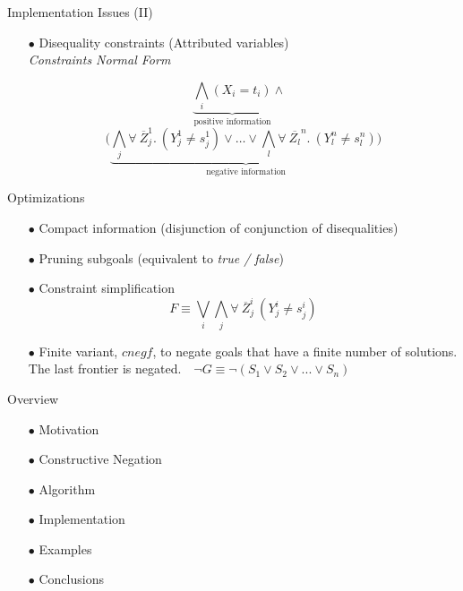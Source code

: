 \documentclass[pdf,slideColor,contemporain]{prosper}
\begin{document}
\begin{slide}{Implementation Issues (II)}
     \begin{itemize}

        \item[$\bullet$] {\blue Disequality constraints} (Attributed
        variables) \\
        \emph{Constraints Normal Form}\\
\begin{small}

\[ \underbrace{\bigwedge_i (X_i = t_i)}_{\mbox{positive information}} \wedge~~~\] 
\[(
\underbrace{\bigwedge_j \forall~ \overline{Z}_j^1.~(Y_j^1 \neq s_j^1)
\vee \ldots \vee \bigwedge_l \forall~ \overline{Z_l}^n.~(Y_l^n
\neq s_l^n) )}_{\mbox{negative information}} \]


\end{small}

     \end{itemize}
\end{slide}
\begin{slide}{Optimizations}
     \begin{itemize}

        \item[$\bullet$] {\blue Compact information} (disjunction of conjunction of disequalities) 

        \item[$\bullet$] {\blue Pruning subgoals} (equivalent to \emph{true / false}) 
        \item[$\bullet$] {\blue Constraint simplification}
\[ F \equiv  \bigvee_i\bigwedge_j \forall~ \overline{Z}_j^i~(Y_j^i \neq s_j^i) \]
\item[$\bullet$] {\blue Finite variant}, $cnegf$, to negate goals that have a
  finite number of solutions. The last frontier is negated. $~~~\neg G \equiv
  \neg(S_1 \vee S_2 \vee ... \vee S_n) $
     \end{itemize}
\end{slide}

\begin{slide}{Overview}
\vspace{0.8cm}
        \begin{itemize}
                \item[{\blue $\bullet$}] Motivation
                \item[{\blue $\bullet$}] Constructive Negation
                \item[{\blue $\bullet$}] Algorithm
                \item[{\blue $\bullet$}] Implementation
                \item[$\bullet$] {\blue Examples}
                \item[{\blue $\bullet$}] Conclusions
        \end{itemize}
\end{slide}
\end{document}
